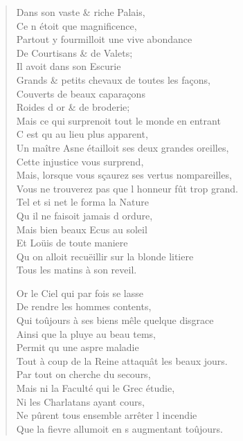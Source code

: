 \begin{verse}
\vin Dans son vaste \& riche Palais, \\
\vin Ce n\textquotesingle{} étoit que magnificence, \\
Partout y fourmilloit une vive abondance \\
\vin De Courtisans \& de Valets; \\
\vin Il avoit dans son Escurie \\
Grands \& petits chevaux de toutes les façons, \\
\vin Couverts de beaux caparaçons \\
\vin Roides d\textquotesingle{} or \& de broderie; \\
Mais ce qui surprenoit tout le monde en entrant \\
\vin C\textquotesingle{} est qu\textquotesingle{} au lieu plus apparent, \\
Un maître Asne étailloit ses deux grandes oreilles, \\
\vin Cette injustice vous surprend, \\
Mais, lorsque vous sçaurez ses vertus nompareilles, \\
Vous ne trouverez pas que l\textquotesingle{} honneur fût trop grand. \\
\vin Tel et si net le forma la Nature \\
\vin Qu\textquotesingle{} il ne faisoit jamais d\textquotesingle{} ordure, \\
\vin Mais bien beaux Ecus au soleil \\
\vin Et Loüis de toute maniere \\
Qu\textquotesingle{} on alloit recuëillir sur la blonde litiere \\
\vin Tous les matins à son reveil.

\vin Or le Ciel qui par fois se lasse \\
\vin De rendre les hommes contents, \\
Qui toûjours à ses biens mêle quelque disgrace \\
\vin Ainsi que la pluye au beau tems, \\
\vin Permit qu\textquotesingle{} une aspre maladie \\
Tout à coup de la Reine attaquât les beaux jours. \\
\vin Par tout on cherche du secours, \\
Mais ni la Faculté qui le Grec étudie, \\
\vin Ni les Charlatans ayant cours, \\
Ne pûrent tous ensemble arrêter l\textquotesingle{} incendie \\
Que la fievre allumoit en s\textquotesingle{} augmentant toûjours.


\end{verse}
